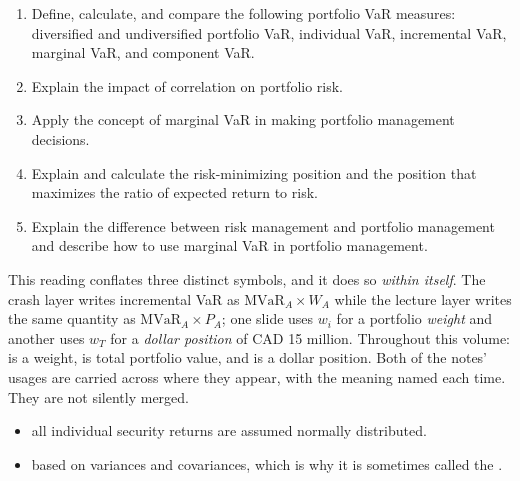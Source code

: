 

\begin{imkeybox}[title={The five objectives in this reading}]
\begin{enumerate}[label=\textbf{\alph*.}]
\item Define, calculate, and compare the following portfolio VaR measures: diversified and undiversified portfolio VaR, individual VaR, incremental VaR, marginal VaR, and component VaR.
\item Explain the impact of correlation on portfolio risk.
\item Apply the concept of marginal VaR in making portfolio management decisions.
\item Explain and calculate the risk-minimizing position and the position that maximizes the ratio of expected return to risk.
\item Explain the difference between risk management and portfolio management and describe how to use marginal VaR in portfolio management.
\end{enumerate}
\end{imkeybox}

\begin{imtrapbox}[breakable=false,title={Read the notation before reading the formulas}]
This reading conflates three distinct symbols, and it does so \emph{within itself}.
The crash layer writes incremental VaR as $\text{MVaR}_A \times W_A$ while the
lecture layer writes the same quantity as $\text{MVaR}_A \times P_A$; one slide
uses $w_i$ for a portfolio \emph{weight} and another uses $w_T$ for a
\emph{dollar position} of CAD 15 million. Throughout this volume:
 is a weight,  is total portfolio value, and
 is a dollar position. Both of the notes' usages are carried
across where they appear, with the meaning named each time. They are not silently
merged.
\end{imtrapbox}


\begin{itemize}
\item {} all individual security returns are assumed
normally distributed.
\item {} based on variances and covariances,
which is why it is sometimes called the .
\end{itemize}

